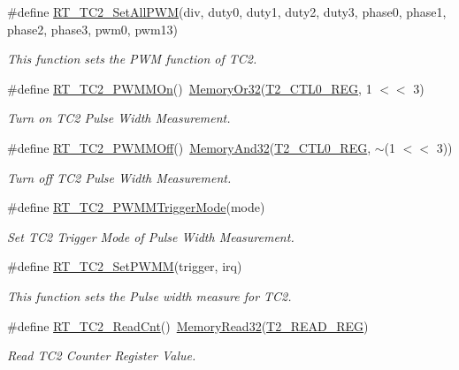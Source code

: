 \begin{DoxyCompactItemize}
\#define \mbox{\hyperlink{a00047_a49e7120e90142442bdd0744f61b572a5}{R\+T\+\_\+\+T\+C2\+\_\+\+Set\+All\+P\+WM}}(div,  duty0,  duty1,  duty2,  duty3,  phase0,  phase1,  phase2,  phase3,  pwm0,  pwm13)
\begin{DoxyCompactList}\small\item\em This function sets the P\+WM function of T\+C2. \end{DoxyCompactList}\item 
\#define \mbox{\hyperlink{a00047_a37ffb0b466d2a13bb9917a818b06776b}{R\+T\+\_\+\+T\+C2\+\_\+\+P\+W\+M\+M\+On}}()~\mbox{\hyperlink{a00020_a27874a97deab7cecdde5ddecf466e31e}{Memory\+Or32}}(\mbox{\hyperlink{a00020_a5853553391e986211306d4f29ab31e47}{T2\+\_\+\+C\+T\+L0\+\_\+\+R\+EG}}, 1 $<$$<$ 3)
\begin{DoxyCompactList}\small\item\em Turn on T\+C2 Pulse Width Measurement. \end{DoxyCompactList}\item 
\#define \mbox{\hyperlink{a00047_abe6d0acfd60eb7058f0622de867c5b87}{R\+T\+\_\+\+T\+C2\+\_\+\+P\+W\+M\+M\+Off}}()~\mbox{\hyperlink{a00020_ad87cedffcaadc51db22594fce55173d4}{Memory\+And32}}(\mbox{\hyperlink{a00020_a5853553391e986211306d4f29ab31e47}{T2\+\_\+\+C\+T\+L0\+\_\+\+R\+EG}}, $\sim$(1 $<$$<$ 3))
\begin{DoxyCompactList}\small\item\em Turn off T\+C2 Pulse Width Measurement. \end{DoxyCompactList}\item 
\#define \mbox{\hyperlink{a00047_a80f5ade258504a1243ccb058dd860475}{R\+T\+\_\+\+T\+C2\+\_\+\+P\+W\+M\+M\+Trigger\+Mode}}(mode)
\begin{DoxyCompactList}\small\item\em Set T\+C2 Trigger Mode of Pulse Width Measurement. \end{DoxyCompactList}\item 
\#define \mbox{\hyperlink{a00047_ad3b483689d5dd170a343222a71f43c9f}{R\+T\+\_\+\+T\+C2\+\_\+\+Set\+P\+W\+MM}}(trigger,  irq)
\begin{DoxyCompactList}\small\item\em This function sets the Pulse width measure for T\+C2. \end{DoxyCompactList}\item 
\#define \mbox{\hyperlink{a00047_a6591a513f367f6e7be0a90cb72aa3d49}{R\+T\+\_\+\+T\+C2\+\_\+\+Read\+Cnt}}()~\mbox{\hyperlink{a00020_a2d484dc15bdf30ee11ab3b05f31f0e16}{Memory\+Read32}}(\mbox{\hyperlink{a00020_ac9b4238c1829d1e3414db560a290e861}{T2\+\_\+\+R\+E\+A\+D\+\_\+\+R\+EG}})
\begin{DoxyCompactList}\small\item\em Read T\+C2 Counter Register Value. \end{DoxyCompactList}\end{DoxyCompactItemize}


